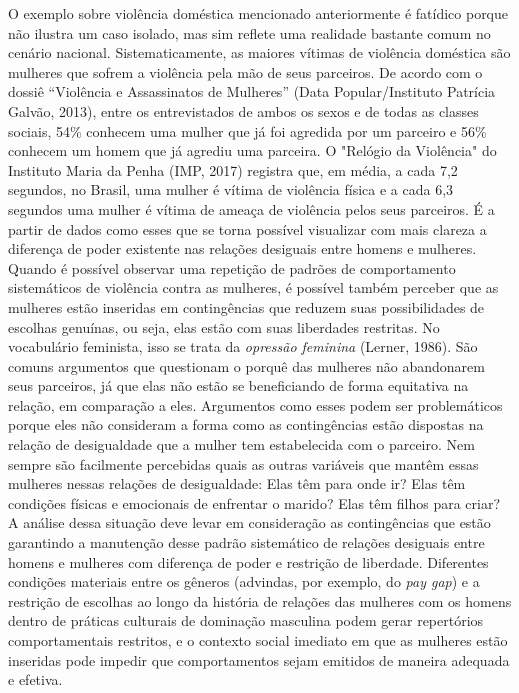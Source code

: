 O exemplo sobre violência doméstica mencionado anteriormente é fatídico porque não ilustra um caso isolado, mas sim reflete uma realidade bastante comum no cenário nacional. Sistematicamente, as maiores vítimas de violência doméstica são mulheres que sofrem a violência pela mão de seus parceiros. De acordo com o dossiê ``Violência e Assassinatos de Mulheres'' (Data Popular/Instituto Patrícia Galvão, 2013), entre os entrevistados de ambos os sexos e de todas as classes sociais, 54\% conhecem uma mulher que já foi agredida por um parceiro e 56\% conhecem um homem que já agrediu uma parceira. O "Relógio da Violência" do Instituto Maria da Penha (IMP, 2017) registra que, em média, a cada 7,2 segundos, no Brasil, uma mulher é vítima de violência física e a cada 6,3 segundos uma mulher é vítima de ameaça de violência pelos seus parceiros. É a partir de dados como esses que se torna possível visualizar com mais clareza a diferença de poder existente nas relações desiguais entre homens e mulheres. Quando é possível observar uma repetição de padrões de comportamento sistemáticos de violência contra as mulheres, é possível também perceber que as mulheres estão inseridas em contingências que reduzem suas possibilidades de escolhas genuínas, ou seja, elas estão com suas liberdades restritas. No vocabulário feminista, isso se trata da \textit{opressão feminina} (Lerner, 1986). São comuns argumentos que questionam o porquê das mulheres não abandonarem seus parceiros, já que elas não estão se beneficiando de forma equitativa na relação, em comparação a eles. Argumentos como esses podem ser problemáticos porque eles não consideram a forma como as contingências estão dispostas na relação de desigualdade que a mulher tem estabelecida com o parceiro. Nem sempre são facilmente percebidas quais as outras variáveis que mantêm essas mulheres nessas relações de desigualdade: Elas têm para onde ir? Elas têm condições físicas e emocionais de enfrentar o marido? Elas têm filhos para criar? A análise dessa situação deve levar em consideração as contingências que estão garantindo a manutenção desse padrão sistemático de relações desiguais entre homens e mulheres com diferença de poder e restrição de liberdade. Diferentes condições materiais entre os gêneros (advindas, por exemplo, do \textit{pay gap}) e a restrição de escolhas ao longo da história de relações das mulheres com os homens dentro de práticas culturais de dominação masculina podem gerar repertórios comportamentais restritos, e o contexto social imediato em que as mulheres estão inseridas pode impedir que comportamentos sejam emitidos de maneira adequada e efetiva.

